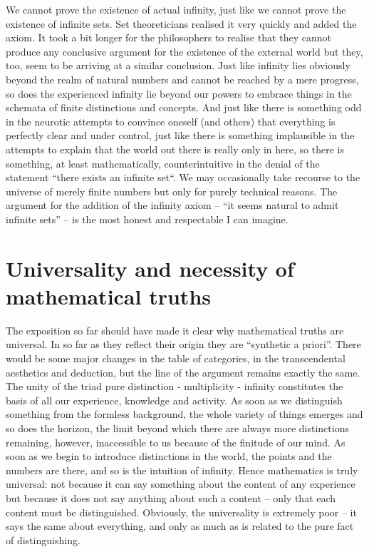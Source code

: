 We cannot prove the existence of actual infinity, just like we cannot prove the existence of infinite sets. Set theoreticians realised it very quickly and added the axiom. It took a bit longer for the philosophers to realise that they cannot produce any conclusive argument for the existence of the external world but they, too, seem to be arriving at a similar conclusion. Just like infinity lies obviously beyond the realm of natural numbers and cannot be reached by a mere progress, so does the experienced infinity lie beyond our powers to embrace things in the schemata of finite distinctions and concepts. And just like there is something odd in the neurotic attempts to convince oneself (and others) that everything is perfectly clear and under control, just like there is something implausible in the attempts to explain that the world out there is really only in here, so there is something, at least mathematically, counterintuitive in the denial of the statement ``there exists an infinite set``. We may occasionally take recourse to the universe of merely finite numbers but only for purely technical reasons. The argument for the addition of the infinity axiom -- ``it seems natural to admit infinite sets'' -- is the most honest and respectable I can imagine.

\section{Universality and necessity of mathematical truths}\label{se:universal}
The exposition so far should have made it clear why mathematical truths are universal. In so far as they reflect their origin they are ``synthetic a priori''. There would be some major changes in the table of categories, in the transcendental aesthetics and deduction, but the line of the argument remains exactly the same. The unity of the triad pure distinction - multiplicity - infinity constitutes the basis of all our experience, knowledge and activity. As soon as we distinguish something from the formless background, the whole variety of things emerges and so does the horizon, the limit beyond which there are always more distinctions remaining, however, inaccessible to us because of the finitude of our mind. As soon as we begin to introduce distinctions in the world, the points and the numbers are there, and so is the intuition of infinity. Hence mathematics is truly universal: not because it can say something about the content of any experience but because it does not say anything about such a content -- only that each content must be distinguished. Obviously, the universality is extremely poor -- it says the same about everything, and only as much as is related to the pure fact of distinguishing. 

